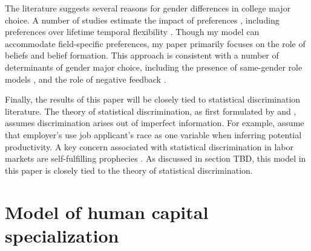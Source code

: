 \documentclass[10 pt]{article}
\newcommand{\toedit}[1]{{\color{gray}#1}}
\newcommand{\toedit}[1]{#1}
\begin{document}
The literature suggests several reasons for gender differences in college major choice.
A number of studies estimate the impact of preferences \parencite{Z13,WZ14}, including preferences over lifetime temporal flexibility \parencite{B15,WZ18}.
Though my model can accommodate field-specific preferences, my paper primarily focuses on the role of beliefs and belief formation.
This approach is consistent with a number of determinants of gender major choice, including the presence of same-gender role models \parencite{PS20,LM20}, and the role of negative feedback \parencite{KTU17}.




Finally, the results of this paper will be closely tied to statistical discrimination literature. 
The theory of statistical discrimination, as first formulated by \textcite{A72} and \textcite{P72}, assumes discrimination arises out of imperfect information.
For example, \textcite{AC77} assume that employer's use job applicant's race as one variable when inferring potential productivity.
A key concern associated with statistical discrimination in labor markets are self-fulfilling prophecies \textcite{LS83}. 
\toedit{As discussed in section TBD, this model in this paper is closely tied to the theory of statistical discrimination}.

 


\section{Model of human capital specialization}\label{sec:model}
\end{document}
